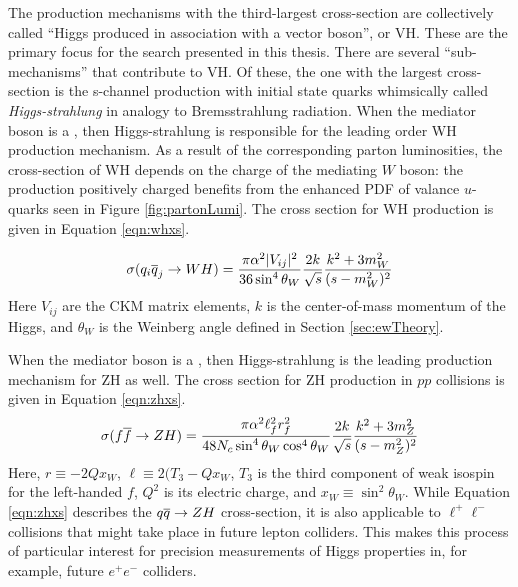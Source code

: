 The production mechanisms with the third-largest cross-section are collectively called ``Higgs produced in association with a vector boson'', or VH.
These are the primary focus for the \hmm search presented in this thesis.
There are several ``sub-mechanisms'' that contribute to VH.
Of these, the one with the largest cross-section is the s-channel production with initial state quarks whimsically called \emph{Higgs-strahlung} in analogy to Bremsstrahlung radiation.
When the mediator boson is a \W, then Higgs-strahlung is responsible for the leading order WH production mechanism.
As a result of the corresponding parton luminosities, the cross-section of WH depends on the charge of the mediating $W$ boson: the production positively charged \Wp benefits from the enhanced PDF of valance $u$-quarks seen in Figure \ref{fig:partonLumi}. 
The cross section for WH production is given in Equation \ref{eqn:whxs}.

\begin{equation}\begin{split}\label{eqn:whxs}
\sigma(q_i\overline{q}_j\to WH)=\frac{\pi\alpha^2 |V_{ij}|^2}{36 \sin^4\theta_W} \frac{2k}{\sqrt{s}} \frac{k^2+3m^2_W}{(s-m^2_W)^2}
\end{split}\end{equation} 
Here $V_{ij}$ are the CKM matrix elements, $k$ is the center-of-mass momentum of the Higgs, and $\theta_W$ is the Weinberg angle defined in Section \ref{sec:ewTheory}.

When the mediator boson is a \Z, then Higgs-strahlung is the leading production mechanism for ZH as well.
The cross section for ZH production in $pp$ collisions is given in Equation \ref{eqn:zhxs}.
\begin{equation}\begin{split}\label{eqn:zhxs}
\sigma(f\overline{f}\to ZH)=\frac{\pi\alpha^2 \ell_f^2r_f^2}{48N_c\sin^4\theta_W\cos^4\theta_W} \frac{2k}{\sqrt{s}} \frac{k^2+3m^2_Z}{(s-m^2_Z)^2}
\end{split}\end{equation} 
Here, $r\equiv-2Qx_W$, $\ell\equiv2(T_3-Qx_W$,
$T_3$ is the third component of weak isospin for the left-handed $f$, $Q^2$ is its electric charge, and $x_W\equiv\sin^2\theta_W$.
While Equation \ref{eqn:zhxs} describes the $q\overline{q}\to ZH$ cross-section, it is also applicable to $\ell^+\ell^-$ collisions that might take place in future lepton colliders.
This makes this process of particular interest for precision measurements of Higgs properties in, for example, future $e^+e^-$ colliders.

